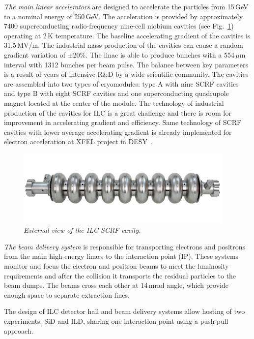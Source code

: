 \textit{The main linear accelerators} are designed to accelerate the particles from 15\,GeV to a nominal energy of 250\,GeV. 
The acceleration is provided by approximately 7400 superconducting radio-frequency nine-cell niobium cavities (see Fig.~\ref{fig:ILCcavity}) operating at 2\,K temperature. 
The baseline accelerating gradient of the cavities is 31.5\,MV/m. 
The industrial mass production of the cavities can cause a random gradient variation of $\pm$20\%. 
The linac is able to produce bunches with a 554\,$\mu$m interval with 1312 bunches per beam pulse.
The balance between key parameters is a result of years of intensive R\&D by a wide scientific community. 
The cavities are assembled into two types of cryomodules: type A with nine SCRF cavities and type B with eight SCRF cavities and one superconducting quadrupole magnet located at the center of the module. 
The technology of industrial production of the cavities for ILC is a great challenge and there is room for improvement in accelerating gradient and efficiency. 
Same technology of SCRF cavities with lower average accelerating gradient is already implemented for electron acceleration at XFEL project in DESY~\cite{Abela:77248}. 
\begin{figure}
{\centering
    \includegraphics[width=0.95\textwidth]{graphics/Cavity.jpg}
    \caption{\sl External view of the ILC SCRF cavity.}
    \label{fig:ILCcavity}
  }
\end{figure}

\textit{The beam delivery system} is responsible for transporting electrons and positrons from the main high-energy linacs to the interaction point (IP). These systems monitor and focus the electron and positron beams to meet the luminosity requirements and after the collision it transports the residual particles to the beam dumps. 
The beams cross each other at 14\,mrad angle, which provide enough space to separate extraction lines. 

The design of ILC detector hall and beam delivery systems allow hosting of two experiments, SiD and ILD, sharing one interaction point using a push-pull approach. 

